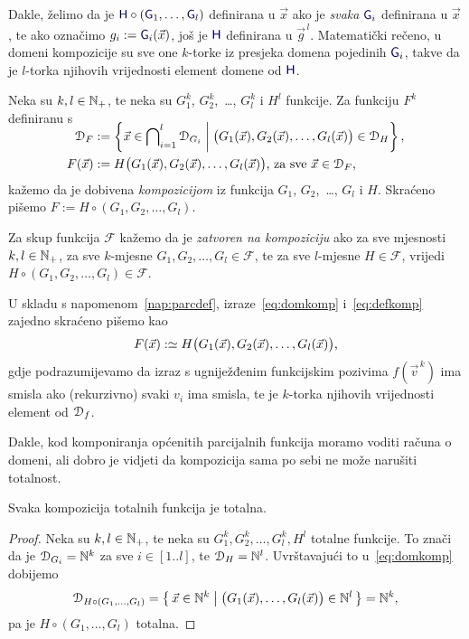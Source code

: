 Dakle, želimo da je $\f H\circ(\f G_1,\dotsc,\f G_l)$ definirana u $\vec x$ ako je \emph{svaka} $\f G_i$ definirana u $\vec x$, te ako označimo $g_i:=\f G_i(\vec x)$, još je $\f H$ definirana u $\vec g^{\,l}$. Matematički rečeno, u domeni kompozicije su sve one $k$-torke iz presjeka domena pojedinih $\f G_i$, takve da je $l$-torka njihovih vrijednosti element domene od $\f H$.
\begin{definicija}
Neka su $k,l\in{\mathbb N}_+$, te neka su $G_1^k$, $G_2^k$,~\ldots, $G_l^k$ i $H^l$ funkcije. Za funkciju $F^k$ definiranu s
\begin{align}
\SwapAboveDisplaySkip
\label{eq:domkomp}
    \dom{F}&:=\left\{\vec x\in\bigcap\nolimits_{i=1}^l\dom{G_i}\;\middle|\;\bigl(G_1(\vec x),G_2(\vec x),\dotsc,G_l(\vec x)\bigr)\in\dom{H}\right\}\text,\\
\label{eq:defkomp}
    F(\vec x)&:=H\bigl(G_1(\vec x),G_2(\vec x),\dotsc,G_l(\vec x)\bigr)\text{, za sve $\vec x\in\dom F$,}
\end{align}
kažemo da je dobivena \emph{kompozicijom} iz funkcija $G_1$, $G_2$,~\ldots, $G_l$ i $H$. Skraćeno pišemo $F:=H\circ(G_1,G_2,\dotsc,G_l)$. %

Za skup funkcija $\mathcal F$ kažemo da je \emph{zatvoren na kompoziciju} ako za sve mjesnosti $k,l\in{\mathbb N}_+$, za sve $k$-mjesne $G_1,G_2,\dotsc,G_l\in\mathcal F$, te za sve $l$-mjesne $H\in\mathcal F$, vrijedi $H\circ(G_1,G_2,\dotsc,G_l)\in\mathcal F$.
\end{definicija}
U skladu s napomenom~\ref{nap:parcdef}, izraze~\eqref{eq:domkomp} i~\eqref{eq:defkomp} zajedno skraćeno pišemo kao
\begin{equation}
    F(\vec x):\simeq H\bigl(G_1(\vec x),G_2(\vec x),\dotsc,G_l(\vec x)\bigr)\text,
\end{equation}
gdje podrazumijevamo da izraz s ugniježđenim funkcijskim pozivima $f(\vec v^{\,k})$ ima smisla ako (rekurzivno) svaki $v_i$ ima smisla, te je $k$-torka njihovih vrijednosti element od $\mathcal D_{f}$.

Dakle, kod komponiranja općenitih parcijalnih funkcija moramo voditi računa o domeni, ali dobro je vidjeti da kompozicija sama po sebi ne može narušiti totalnost.

\begin{propozicija}\label{prop:comptot}
Svaka kompozicija totalnih funkcija je totalna.
\end{propozicija}
\begin{proof}
Neka su $k,l\in{\mathbb N}_+$, te neka su $G_1^k,G_2^k,\dotsc,G_l^k,H^l$ totalne funkcije. To znači da je $\mathcal D_{G_i}={\mathbb N}^k$ za sve $i\in[1..l]$, te $\mathcal D_{H}={\mathbb N}^l$. Uvrštavajući to u~\eqref{eq:domkomp} dobijemo
\begin{equation}
    \mathcal D_{H\circ(G_1,\dots,G_l)}=\left\{\,\vec x\in{\mathbb N}^k\;\middle|\;\bigl(G_1(\vec x),\dotsc,G_l(\vec x)\bigr)\in{\mathbb N}^l\,\right\}={\mathbb N}^k\text,
\end{equation}
pa je $H\circ(G_1,\dotsc,G_l)$ totalna.
\end{proof}

